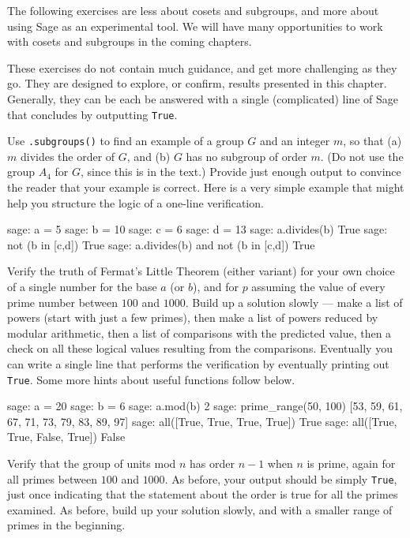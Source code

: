 The following exercises are less about cosets and subgroups, and more about using Sage as an experimental tool.  We will have many opportunities to work with cosets and subgroups in the coming chapters.\par
%
These exercises do not contain much guidance, and get more challenging as they go.  They are designed to explore, or confirm, results presented in this chapter.  Generally, they can be each be answered with a single (complicated) line of Sage that concludes by outputting \verb?True?.
\begin{sageverbatim}\end{sageverbatim}
%
%
Use \verb?.subgroups()? to find an example of a group $G$ and an integer $m$, so that (a) $m$ divides the order of $G$, and (b) $G$ has no subgroup of order $m$.  (Do not use the group $A_4$ for $G$, since this is in the text.)  Provide just enough output to convince the reader that your example is correct.  Here is a very simple example that might help you structure the logic of a one-line verification.
%
\begin{sageexample}
sage: a = 5
sage: b = 10
sage: c = 6
sage: d = 13
sage: a.divides(b)
True
sage: not (b in [c,d])
True
sage: a.divides(b) and not (b in [c,d])
True
\end{sageexample}
%
\begin{sageverbatim}\end{sageverbatim}
%
%
Verify the truth of Fermat's Little Theorem (either variant) for your own choice of a single number for the base $a$ (or $b$), and for $p$ assuming the value of every prime number between $100$ and $1000$.  Build up a solution slowly --- make a list of powers (start with just a few primes), then make a list of powers reduced by modular arithmetic, then a list of comparisons with  the predicted value, then a check on all these logical values resulting from the comparisons.  Eventually you can write a single line that performs the verification by eventually printing out \verb?True?.  Some more hints about useful functions follow below.
%
\begin{sageexample}
sage: a = 20
sage: b = 6
sage: a.mod(b)
2
sage: prime_range(50, 100)
[53, 59, 61, 67, 71, 73, 79, 83, 89, 97]
sage: all([True, True, True, True])
True
sage: all([True, True, False, True])
False
\end{sageexample}
%
\begin{sageverbatim}\end{sageverbatim}
%
%
Verify that the group of units mod $n$ has order $n-1$ when $n$ is prime, again for all primes between $100$ and $1000$.  As before, your output should be simply \verb?True?, just once indicating that the statement about the order is true for all the primes examined.  As before, build up your solution slowly, and with a smaller range of primes in the beginning.

